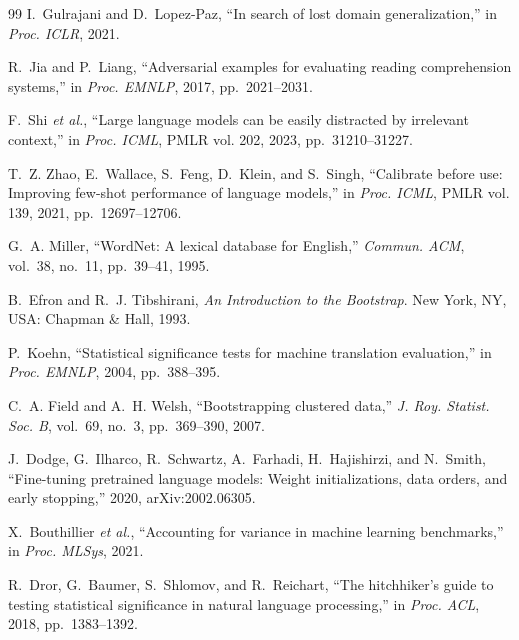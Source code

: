 \documentclass[conference]{IEEEtran}
\begin{document}
\begin{thebibliography}{99}
I.~Gulrajani and D.~Lopez-Paz, ``In search of lost domain generalization,'' in \emph{Proc. ICLR}, 2021.

R.~Jia and P.~Liang, ``Adversarial examples for evaluating reading comprehension systems,'' in \emph{Proc. EMNLP}, 2017, pp.~2021--2031.

F.~Shi \emph{et al.}, ``Large language models can be easily distracted by irrelevant context,'' in \emph{Proc. ICML}, PMLR vol. 202, 2023, pp.~31210--31227.

T.~Z. Zhao, E.~Wallace, S.~Feng, D.~Klein, and S.~Singh, ``Calibrate before use: Improving few-shot performance of language models,'' in \emph{Proc. ICML}, PMLR vol. 139, 2021, pp.~12697--12706.

G.~A. Miller, ``{WordNet}: A lexical database for {English},'' \emph{Commun. ACM}, vol.~38, no.~11, pp.~39--41, 1995.

B.~Efron and R.~J. Tibshirani, \emph{An Introduction to the Bootstrap}. New York, NY, USA: Chapman \& Hall, 1993.

P.~Koehn, ``Statistical significance tests for machine translation evaluation,'' in \emph{Proc. EMNLP}, 2004, pp.~388--395.

C.~A. Field and A.~H. Welsh, ``Bootstrapping clustered data,'' \emph{J. Roy. Statist. Soc. B}, vol.~69, no.~3, pp.~369--390, 2007.

J.~Dodge, G.~Ilharco, R.~Schwartz, A.~Farhadi, H.~Hajishirzi, and N.~Smith, ``Fine-tuning pretrained language models: Weight initializations, data orders, and early stopping,'' 2020, arXiv:2002.06305.

X.~Bouthillier \emph{et al.}, ``Accounting for variance in machine learning benchmarks,'' in \emph{Proc. MLSys}, 2021.

R.~Dror, G.~Baumer, S.~Shlomov, and R.~Reichart, ``The hitchhiker's guide to testing statistical significance in natural language processing,'' in \emph{Proc. ACL}, 2018, pp.~1383--1392.

\end{thebibliography}
\end{document}
